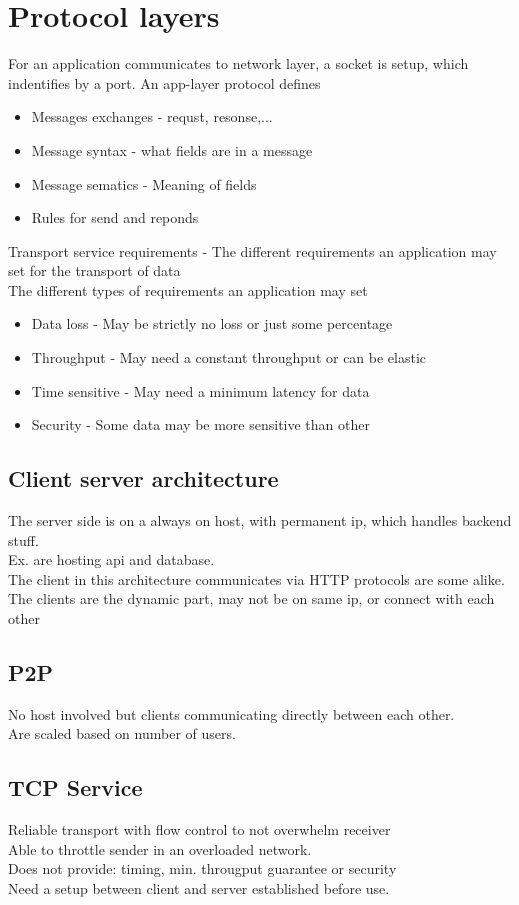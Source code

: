 \documentclass[12pt, a4paper]{article}
\begin{document}
	\section{Protocol layers}
		For an application communicates to network layer, a socket is setup, which indentifies by a port.
		An app-layer protocol defines
		\begin{itemize}
			\item Messages exchanges - requst, resonse,...
			\item Message syntax - what fields are in a message
			\item Message sematics - Meaning of fields
			\item Rules for send and reponds
		\end{itemize}
		Transport service requirements - The different requirements an application may set for the transport of data\\
		The different types of requirements an application may set
		\begin{itemize}
			\item Data loss - May be strictly no loss or just some percentage
			\item Throughput - May need a constant throughput or can be elastic 
			\item Time sensitive - May need a minimum latency for data
			\item Security - Some data may be more sensitive than other
		\end{itemize}
		\subsection{Client server architecture}
			The server side is on a always on host, with permanent ip, which handles backend stuff. \\
			Ex. are hosting api and database.\\
			The client in this architecture communicates via HTTP protocols are some alike.\\
			The clients are the dynamic part, may not be on same ip, or connect with each other\\
		\subsection{P2P}
			No host involved but clients communicating directly between each other.\\
			Are scaled based on number of users.
		\subsection{TCP Service}
			Reliable transport with flow control to not overwhelm receiver\\
			Able to throttle sender in an overloaded network.\\
			Does not provide: timing, min. througput guarantee or security\\
			Need a setup between client and server established before use.
\end{document}
